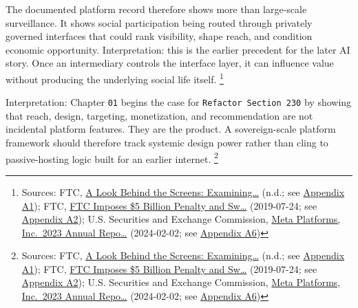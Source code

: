 \documentclass[
  american,
  11pt,
  letterpaper,
]{article}
\begin{document}
The documented platform record therefore shows more than large-scale
surveillance. It shows social participation being routed through
privately governed interfaces that could rank visibility, shape reach,
and condition economic opportunity. Interpretation: this is the earlier
precedent for the later AI story. Once an intermediary controls the
interface layer, it can influence value without producing the underlying
social life itself. \footnote{Sources: FTC,
  \href{https://www.ftc.gov/reports/look-behind-screens-examining-data-practices-social-media-video-streaming-services}{A
  Look Behind the Screens: Examining\ldots{}} (n.d.; see
  \hyperref[appendix-a1-a-look-behind-the-screens-examining-the-data-practices-of-social-media-and-video-streaming-services]{Appendix
  A1}); FTC,
  \href{https://www.ftc.gov/news-events/news/press-releases/2019/07/ftc-imposes-5-billion-penalty-sweeping-new-privacy-restrictions-facebook}{FTC
  Imposes \$5 Billion Penalty and Sw\ldots{}} (2019-07-24; see
  \hyperref[appendix-a2-ftc-imposes-5-billion-penalty-and-sweeping-new-privacy-restrictions-on-facebook]{Appendix
  A2}); U.S. Securities and Exchange Commission,
  \href{https://www.sec.gov/Archives/edgar/data/1326801/000132680124000012/meta-20231231.htm}{Meta
  Platforms, Inc.~2023 Annual Repo\ldots{}} (2024-02-02; see
  \hyperref[appendix-a6-meta-platforms-inc-2023-annual-report-form-10-k]{Appendix
  A6})}

Interpretation: Chapter \texttt{01} begins the case for
\texttt{Refactor\ Section\ 230} by showing that reach, design,
targeting, monetization, and recommendation are not incidental platform
features. They are the product. A sovereign-scale platform framework
should therefore track systemic design power rather than cling to
passive-hosting logic built for an earlier internet. \footnote{Sources:
  FTC,
  \href{https://www.ftc.gov/reports/look-behind-screens-examining-data-practices-social-media-video-streaming-services}{A
  Look Behind the Screens: Examining\ldots{}} (n.d.; see
  \hyperref[appendix-a1-a-look-behind-the-screens-examining-the-data-practices-of-social-media-and-video-streaming-services]{Appendix
  A1}); FTC,
  \href{https://www.ftc.gov/news-events/news/press-releases/2019/07/ftc-imposes-5-billion-penalty-sweeping-new-privacy-restrictions-facebook}{FTC
  Imposes \$5 Billion Penalty and Sw\ldots{}} (2019-07-24; see
  \hyperref[appendix-a2-ftc-imposes-5-billion-penalty-and-sweeping-new-privacy-restrictions-on-facebook]{Appendix
  A2}); U.S. Securities and Exchange Commission,
  \href{https://www.sec.gov/Archives/edgar/data/1326801/000132680124000012/meta-20231231.htm}{Meta
  Platforms, Inc.~2023 Annual Repo\ldots{}} (2024-02-02; see
  \hyperref[appendix-a6-meta-platforms-inc-2023-annual-report-form-10-k]{Appendix
  A6})}
\end{document}
